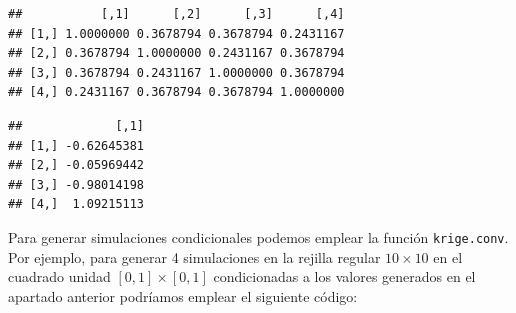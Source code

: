 \documentclass[
]{book}
\newenvironment{Shaded}{\begin{snugshade}}{\end{snugshade}}
\newcommand{\CommentTok}[1]{\textcolor[rgb]{0.56,0.35,0.01}{\textit{#1}}}
\newcommand{\ControlFlowTok}[1]{\textcolor[rgb]{0.13,0.29,0.53}{\textbf{#1}}}
\newcommand{\DataTypeTok}[1]{\textcolor[rgb]{0.13,0.29,0.53}{#1}}
\newcommand{\DecValTok}[1]{\textcolor[rgb]{0.00,0.00,0.81}{#1}}
\newcommand{\KeywordTok}[1]{\textcolor[rgb]{0.13,0.29,0.53}{\textbf{#1}}}
\newcommand{\NormalTok}[1]{#1}
\newcommand{\OperatorTok}[1]{\textcolor[rgb]{0.81,0.36,0.00}{\textbf{#1}}}
\newcommand{\StringTok}[1]{\textcolor[rgb]{0.31,0.60,0.02}{#1}}
\theoremstyle{break}
\theoremstyle{definition}
\theoremstyle{definition}
\theoremstyle{definition}
\theoremstyle{remark}
\begin{document}
\begin{Shaded}
\end{Shaded}

\begin{verbatim}
##           [,1]      [,2]      [,3]      [,4]
## [1,] 1.0000000 0.3678794 0.3678794 0.2431167
## [2,] 0.3678794 1.0000000 0.2431167 0.3678794
## [3,] 0.3678794 0.2431167 1.0000000 0.3678794
## [4,] 0.2431167 0.3678794 0.3678794 1.0000000
\end{verbatim}

\begin{Shaded}
\end{Shaded}

\begin{verbatim}
##             [,1]
## [1,] -0.62645381
## [2,] -0.05969442
## [3,] -0.98014198
## [4,]  1.09215113
\end{verbatim}

Para generar simulaciones condicionales podemos emplear la función \texttt{krige.conv}.
Por ejemplo, para generar 4 simulaciones en la rejilla regular \(10\times10\) en el
cuadrado unidad \([0,1] \times [0,1]\) condicionadas a los
valores generados en el apartado anterior podríamos emplear el siguiente código:
\end{document}
